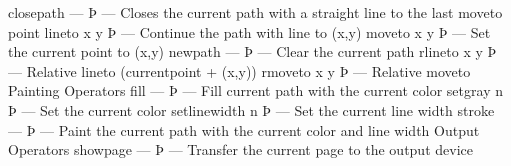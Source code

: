 closepath — Þ —
Closes the current path with a straight line to the last moveto point
lineto x y Þ —
Continue the path with line to (x,y)
moveto x y Þ —
Set the current point to (x,y)
newpath — Þ —
Clear the current path
rlineto x y Þ —
Relative lineto (currentpoint + (x,y))
rmoveto x y Þ —
Relative moveto
Painting Operators
fill — Þ —
Fill current path with the current color
setgray n Þ —
Set the current color
setlinewidth n Þ —
Set the current line width
stroke — Þ —
Paint the current path with the current color and line width
Output Operators
showpage — Þ —
Transfer the current page to the output device